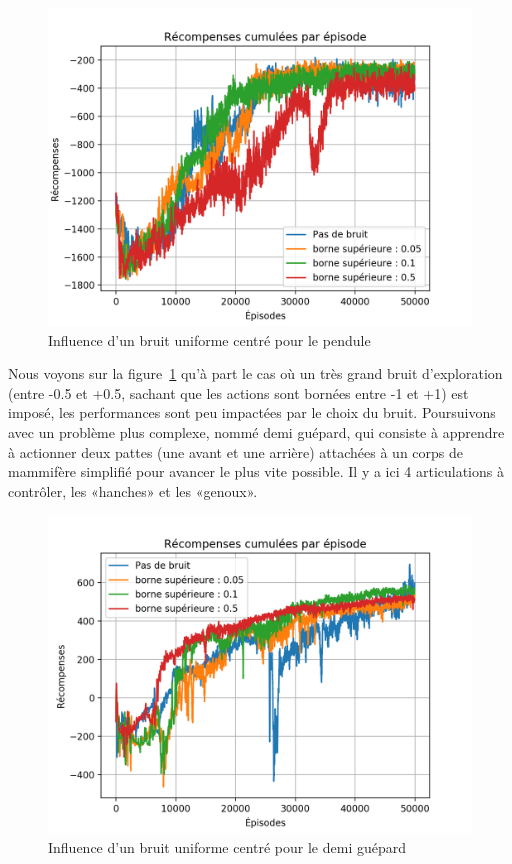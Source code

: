 \documentclass[letterpaper, french]{article}
\begin{document}
\begin{figure}[!h]
\begin{center}
\includegraphics[scale=0.5]{assiettes/pendulum_uniform.png}
\caption{Influence d'un bruit uniforme centré pour le pendule}
\label{fig3}
\end{center}
\end{figure}
Nous voyons sur la figure~\ref{fig3} qu'à part le cas où un très grand bruit d'exploration (entre -0.5 et +0.5, sachant que les actions sont bornées entre -1 et +1) est imposé, les performances sont peu impactées par le choix du bruit.
\smallbreak
Poursuivons avec un problème plus complexe, nommé demi guépard, qui consiste à apprendre à actionner deux pattes (une avant et une arrière) attachées à un corps de mammifère simplifié pour avancer le plus vite possible. Il y a ici 4 articulations à contrôler, les «hanches» et les «genoux».
\begin{figure}[h]
\begin{center}
\includegraphics[scale=0.5]{assiettes/halfCheetah_uniform.png}
\caption{Influence d'un bruit uniforme centré pour le demi guépard}
\label{fig4}
\end{center}
\end{figure}
\end{document}
